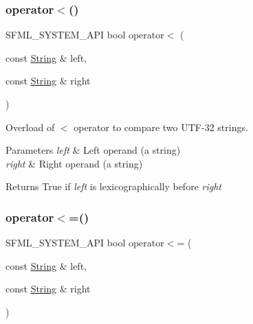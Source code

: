 \subsubsection{\texorpdfstring{operator$<$()}{operator<()}}
{\footnotesize\ttfamily S\+F\+M\+L\+\_\+\+S\+Y\+S\+T\+E\+M\+\_\+\+A\+PI bool operator$<$ (\begin{DoxyParamCaption}\item[{const \mbox{\hyperlink{classsf_1_1_string}{String}} \&}]{left,  }\item[{const \mbox{\hyperlink{classsf_1_1_string}{String}} \&}]{right }\end{DoxyParamCaption})\hspace{0.3cm}{\ttfamily [related]}}



Overload of $<$ operator to compare two U\+T\+F-\/32 strings. 


\begin{DoxyParams}{Parameters}
{\em left} & Left operand (a string) \\
\hline
{\em right} & Right operand (a string)\\
\hline
\end{DoxyParams}
\begin{DoxyReturn}{Returns}
True if {\itshape left} is lexicographically before {\itshape right} \begin{DoxyVerb}\end{DoxyVerb}
 
\end{DoxyReturn}
\mbox{\label{classsf_1_1_string_abd342b6094b81cd086c7929b53b112ae}} 
\subsubsection{\texorpdfstring{operator$<$=()}{operator<=()}}
{\footnotesize\ttfamily S\+F\+M\+L\+\_\+\+S\+Y\+S\+T\+E\+M\+\_\+\+A\+PI bool operator$<$= (\begin{DoxyParamCaption}\item[{const \mbox{\hyperlink{classsf_1_1_string}{String}} \&}]{left,  }\item[{const \mbox{\hyperlink{classsf_1_1_string}{String}} \&}]{right }\end{DoxyParamCaption})\hspace{0.3cm}{\ttfamily [related]}}



